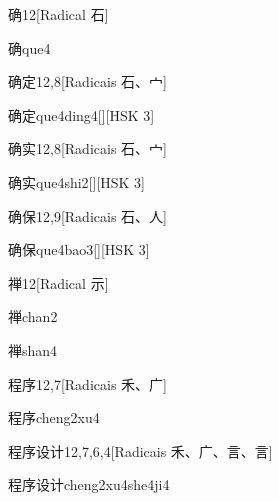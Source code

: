 \begin{entry}{确}{12}[Radical ⽯]
  \begin{phonetics}{确}{que4}
  \end{phonetics}
\end{entry}

\begin{entry}{确定}{12,8}[Radicais ⽯、⼧]
  \begin{phonetics}{确定}{que4ding4}[][HSK 3]
  \end{phonetics}
\end{entry}

\begin{entry}{确实}{12,8}[Radicais ⽯、⼧]
  \begin{phonetics}{确实}{que4shi2}[][HSK 3]
  \end{phonetics}
\end{entry}

\begin{entry}{确保}{12,9}[Radicais ⽯、⼈]
  \begin{phonetics}{确保}{que4bao3}[][HSK 3]
  \end{phonetics}
\end{entry}

\begin{entry}{禅}{12}[Radical ⽰]
  \begin{phonetics}{禅}{chan2}
  \end{phonetics}
  \begin{phonetics}{禅}{shan4}
  \end{phonetics}
\end{entry}

\begin{entry}{程序}{12,7}[Radicais ⽲、⼴]
  \begin{phonetics}{程序}{cheng2xu4}
  \end{phonetics}
\end{entry}

\begin{entry}{程序设计}{12,7,6,4}[Radicais ⽲、⼴、⾔、⾔]
  \begin{phonetics}{程序设计}{cheng2xu4she4ji4}
  \end{phonetics}
\end{entry}

